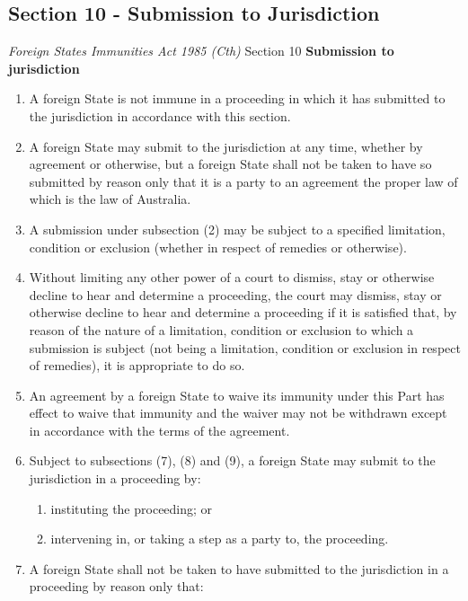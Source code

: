 \subsection{Section 10 - Submission to Jurisdiction}
\begin{statutedetails}{\textit{Foreign States Immunities Act 1985 (Cth)} Section 10}
    \flushleft
    \textbf{Submission to jurisdiction}

    \begin{enumerate}[label=(\arabic*)]
        \item A foreign State is not immune in a proceeding in which it has submitted to the jurisdiction in accordance with this section.
        \item A foreign State may submit to the jurisdiction at any time, whether by agreement or otherwise, but a foreign State shall not be taken to have so submitted by reason only that it is a party to an agreement the proper law of which is the law of Australia.
        \item A submission under subsection (2) may be subject to a specified limitation, condition or exclusion (whether in respect of remedies or otherwise).
        \item Without limiting any other power of a court to dismiss, stay or otherwise decline to hear and determine a proceeding, the court may dismiss, stay or otherwise decline to hear and determine a proceeding if it is satisfied that, by reason of the nature of a limitation, condition or exclusion to which a submission is subject (not being a limitation, condition or exclusion in respect of remedies), it is appropriate to do so.
        \item An agreement by a foreign State to waive its immunity under this Part has effect to waive that immunity and the waiver may not be withdrawn except in accordance with the terms of the agreement.
        \item Subject to subsections (7), (8) and (9), a foreign State may submit to the jurisdiction in a proceeding by:
        \begin{enumerate}[label=(\alph*)]
            \item instituting the proceeding; or
            \item intervening in, or taking a step as a party to, the proceeding.           
        \end{enumerate}
        \item A foreign State shall not be taken to have submitted to the jurisdiction in a proceeding by reason only that:

\end{enumerate}
\end{statutedetails}
